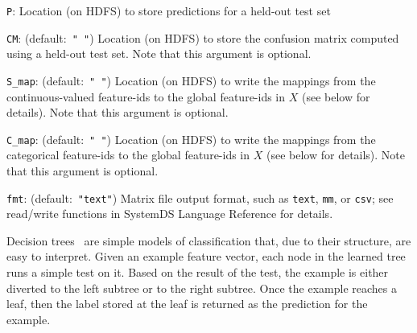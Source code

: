 \begin{Description}
	\item[{\tt P}:] 
	Location (on HDFS) to store predictions for a held-out test set
	\item[{\tt CM}:] (default:\mbox{ }{\tt " "})
	Location (on HDFS) to store the confusion matrix computed using a held-out test set. Note that this argument is optional.
	\item[{\tt S\_map}:] (default:\mbox{ }{\tt " "})
	Location (on HDFS) to write the mappings from the continuous-valued feature-ids to the global feature-ids in $X$ (see below for details). Note that this argument is optional.
	\item[{\tt C\_map}:] (default:\mbox{ }{\tt " "})
	Location (on HDFS) to write the mappings from the categorical feature-ids to the global feature-ids in $X$ (see below for details). Note that this argument is optional.
	\item[{\tt fmt}:] (default:\mbox{ }{\tt "text"})
	Matrix file output format, such as {\tt text}, {\tt mm}, or {\tt csv};
	see read/write functions in SystemDS Language Reference for details.
\end{Description}


 \smallskip

 
Decision trees~\cite{BreimanFOS84:dtree} are simple models of
classification that,  due to their structure,  are easy to
interpret. Given an example feature vector, each node in the learned
tree runs a simple test on it. Based on the result of the test, the
example is either diverted to the left subtree or to the right
subtree. Once the example reaches a leaf, then the label stored at the
leaf is returned as the prediction for the example.


